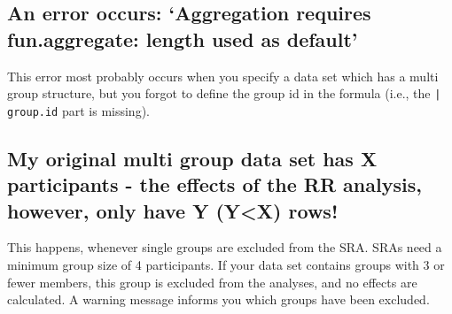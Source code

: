 \documentclass[a4paper]{article}\usepackage[]{graphicx}\usepackage[]{color}
\begin{document}







\subsection{An error occurs: `Aggregation requires fun.aggregate: length used as default'} %
\label{sub:an_error_occurs_aggregation_requires_fun_aggregate_length_used_as_default_}
This error most probably occurs when you specify a data set which has a multi group structure, but you forgot to define the group id in the formula (i.e., the \texttt{| group.id} part is missing).






\subsection{My original multi group data set has X participants - the effects of the RR analysis, however, only have Y (Y<X) rows!} %
\label{sub:my_original_multi_group_data_set_has_x_participants_the_effects_of_the_rr_analysis_hiow}
This happens, whenever single groups are excluded from the SRA. SRAs need a minimum group size of 4 participants. If your data set contains groups with 3 or fewer members, this group is excluded from the analyses, and no effects are calculated. A warning message informs you which groups have been excluded.




\end{document}
